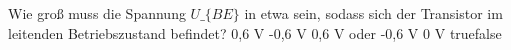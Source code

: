     {Wie groß muss die Spannung $U\_\{BE\}$ in etwa sein, sodass sich der Transistor im leitenden Betriebszustand befindet?}
    {0,6 V}
    {-0,6 V}
    {0,6 V oder -0,6 V}
    {0 V}
    {true}{false}